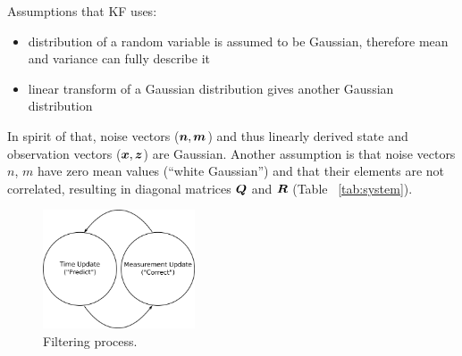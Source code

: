 Assumptions that KF uses:
\begin{itemize}
\item distribution of a random variable is assumed to be Gaussian, therefore mean and variance can fully describe it
\item linear transform of a Gaussian distribution gives another Gaussian distribution 
\end{itemize}
In spirit of that, noise vectors ($\boldsymbol{n}, \boldsymbol{m}$)  and thus linearly derived state and observation vectors ($\boldsymbol{x}, \boldsymbol{z}$) are Gaussian. Another assumption is that noise vectors $n$, $m$ have zero mean values (``white Gaussian'') and that their elements are not correlated, resulting in diagonal matrices $\boldsymbol{Q}$ and $\boldsymbol{R}$ (Table ~\ref{tab:system}).

\begin{figure}
  \centering
    \includegraphics[width=0.4\textwidth]{kalman/fig/diagram-kalman.eps}
  \caption{Filtering process.}
\vspace{-10pt}
\label{fig:diagram-kalman}
\end{figure}

